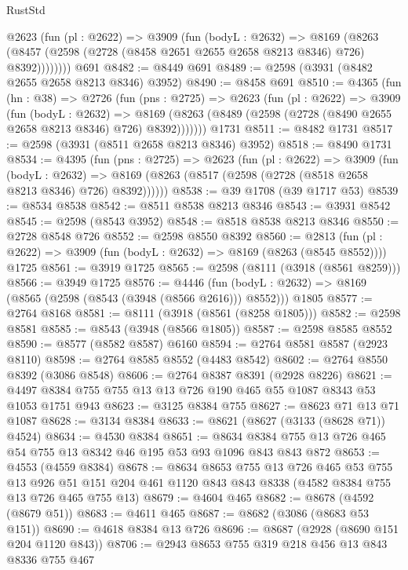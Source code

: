 \begin{lexlean}{RustStd}
\begin{coremodule}
        @2623
          (fun (pl : @2622) =>
          @3909
            (fun (bodyL : @2632) =>
            @8169
              (@8263 (@8457 (@2598 (@2728 (@8458 @2651 @2655 @2658 @8213 @8346) @726) @8392))))))))
    @691
@8482 := @8449 @691
@8489 := @2598 (@3931 (@8482 @2655 @2658 @8213 @8346) @3952)
@8490 := @8458 @691
@8510 := @4365
    (fun (hn : @38) =>
    @2726
      (fun (pns : @2725) =>
      @2623
        (fun (pl : @2622) =>
        @3909
          (fun (bodyL : @2632) =>
          @8169 (@8263 (@8489 (@2598 (@2728 (@8490 @2655 @2658 @8213 @8346) @726) @8392)))))))
    @1731
@8511 := @8482 @1731
@8517 := @2598 (@3931 (@8511 @2658 @8213 @8346) @3952)
@8518 := @8490 @1731
@8534 := @4395
    (fun (pns : @2725) =>
    @2623
      (fun (pl : @2622) =>
      @3909
        (fun (bodyL : @2632) =>
        @8169 (@8263 (@8517 (@2598 (@2728 (@8518 @2658 @8213 @8346) @726) @8392))))))
@8538 := @39 @1708 (@39 @1717 @53)
@8539 := @8534 @8538
@8542 := @8511 @8538 @8213 @8346
@8543 := @3931 @8542
@8545 := @2598 (@8543 @3952)
@8548 := @8518 @8538 @8213 @8346
@8550 := @2728 @8548 @726
@8552 := @2598 @8550 @8392
@8560 := @2813
    (fun (pl : @2622) => @3909 (fun (bodyL : @2632) => @8169 (@8263 (@8545 @8552))))
    @1725
@8561 := @3919 @1725
@8565 := @2598 (@8111 (@3918 (@8561 @8259)))
@8566 := @3949 @1725
@8576 := @4446
    (fun (bodyL : @2632) => @8169 (@8565 (@2598 (@8543 (@3948 (@8566 @2616))) @8552)))
    @1805
@8577 := @2764 @8168
@8581 := @8111 (@3918 (@8561 (@8258 @1805)))
@8582 := @2598 @8581
@8585 := @8543 (@3948 (@8566 @1805))
@8587 := @2598 @8585 @8552
@8590 := @8577 (@8582 @8587) @6160
@8594 := @2764 @8581 @8587 (@2923 @8110)
@8598 := @2764 @8585 @8552 (@4483 @8542)
@8602 := @2764 @8550 @8392 (@3086 @8548)
@8606 := @2764 @8387 @8391 (@2928 @8226)
@8621 := @4497 @8384 @755 @755 @13 @13 @726 @190 @465 @55 @1087 @8343 @53 @1053 @1751 @943
@8623 := @3125 @8384 @755
@8627 := @8623 @71 @13 @71 @1087
@8628 := @3134 @8384
@8633 := @8621 (@8627 (@3133 (@8628 @71)) @4524)
@8634 := @4530 @8384
@8651 := @8634 @8384 @755 @13 @726 @465 @54 @755 @13 @8342 @46 @195 @53 @93 @1096 @843 @843 @872
@8653 := @4553 (@4559 @8384)
@8678 := @8634
    @8653
    @755
    @13
    @726
    @465
    @53
    @755
    @13
    @926
    @51
    @151
    @204
    @461
    @1120
    @843
    @843
    @8338
    (@4582 @8384 @755 @13 @726 @465 @755 @13)
@8679 := @4604 @465
@8682 := @8678 (@4592 (@8679 @51))
@8683 := @4611 @465
@8687 := @8682 (@3086 (@8683 @53 @151))
@8690 := @4618 @8384 @13 @726
@8696 := @8687 (@2928 (@8690 @151 @204 @1120 @843))
@8706 := @2943 @8653 @755 @319 @218 @456 @13 @843 @8336 @755 @467

\end{coremodule}
\end{lexlean}
